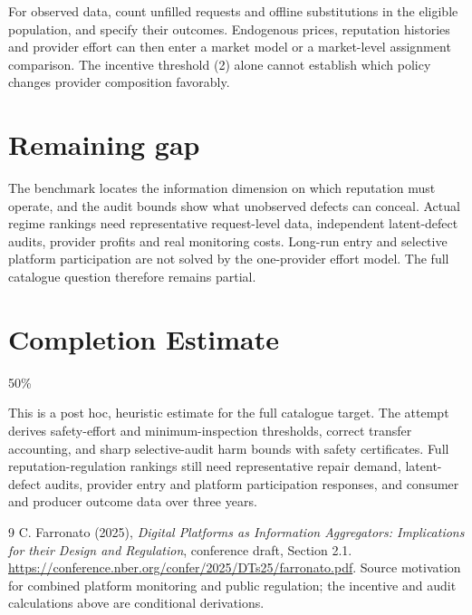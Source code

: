 \documentclass[11pt,a4paper]{article}
\begin{document}
For observed data, count unfilled requests and offline substitutions in the eligible population, and specify their outcomes. Endogenous prices, reputation histories and provider effort can then enter a market model or a market-level assignment comparison. The incentive threshold (2) alone cannot establish which policy changes provider composition favorably.

\section{Remaining gap}
The benchmark locates the information dimension on which reputation must operate, and the audit bounds show what unobserved defects can conceal. Actual regime rankings need representative request-level data, independent latent-defect audits, provider profits and real monitoring costs. Long-run entry and selective platform participation are not solved by the one-provider effort model. The full catalogue question therefore remains partial.

\section{Completion Estimate}
50\%

This is a post hoc, heuristic estimate for the full catalogue target.
The attempt derives safety-effort and minimum-inspection thresholds, correct transfer accounting, and sharp selective-audit harm bounds with safety certificates. Full reputation-regulation rankings still need representative repair demand, latent-defect audits, provider entry and platform participation responses, and consumer and producer outcome data over three years.

\begin{thebibliography}{9}
 C. Farronato (2025), \emph{Digital Platforms as Information Aggregators: Implications for their Design and Regulation}, conference draft, Section 2.1. \url{https://conference.nber.org/confer/2025/DTs25/farronato.pdf}. Source motivation for combined platform monitoring and public regulation; the incentive and audit calculations above are conditional derivations.
\end{thebibliography}
\end{document}

